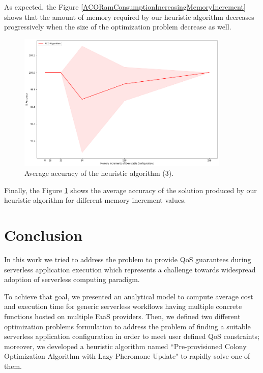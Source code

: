 \documentclass[12pt,a4paper]{report}
\newcommand{\QuoteIntro}{``}
\begin{document}
As expected, the Figure \ref{ACORamConsumptionIncreasingMemoryIncrement} shows that the amount of memory required by our heuristic algorithm decreases progressively when the size of the optimization problem decrease as well.

\begin{figure}[h]
	\centering
	\includegraphics[width=0.9\textwidth]{./experiments/ACOvsOptimalAccuracyIncreasingMemoryIncrement.png}
	\caption{Average accuracy of the heuristic algorithm (3).}%
	\label{ACOvsOptimalAccuracyIncreasingMemoryIncrement}
\end{figure}

Finally, the Figure \ref{ACOvsOptimalAccuracyIncreasingMemoryIncrement} shows the average accuracy of the solution produced by our heuristic algorithm for different memory increment values.

\chapter{Conclusion}\label{chapterConclusion}

In this work we tried to address the problem to provide QoS guarantees during serverless application execution which represents a challenge towards widespread adoption of serverless computing paradigm.

To achieve that goal, we presented an analytical model to compute average cost and execution time for generic serverless workflows having multiple concrete functions hosted on multiple FaaS providers. Then, we defined two different optimization problems formulation to address the problem of finding a suitable serverless application configuration in order to meet user defined QoS constraints; moreover, we developed a heuristic algorithm named \QuoteIntro Pre-provisioned Colony Optimization Algorithm with Lazy Pheromone Update" to rapidly solve one of them. 
\end{document}

